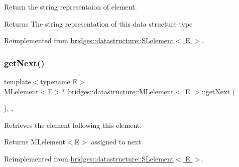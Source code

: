 Return the string representaion of element. 

\begin{DoxyReturn}{Returns}
The string representation of this data structure type 
\end{DoxyReturn}


Reimplemented from \hyperlink{classbridges_1_1datastructure_1_1_s_lelement_a602156aacacd73d1faa365d68d8af31b}{bridges\+::datastructure\+::\+S\+Lelement$<$ E $>$}.

\mbox{\label{classbridges_1_1datastructure_1_1_m_lelement_a47b417db0b948b6899eece572bef9274}} 
\subsubsection{\texorpdfstring{get\+Next()}{getNext()}\hspace{0.1cm}{\footnotesize\ttfamily [1/2]}}
{\footnotesize\ttfamily template$<$typename E$>$ \\
\hyperlink{classbridges_1_1datastructure_1_1_m_lelement}{M\+Lelement}$<$E$>$$\ast$ \hyperlink{classbridges_1_1datastructure_1_1_m_lelement}{bridges\+::datastructure\+::\+M\+Lelement}$<$ E $>$\+::get\+Next (\begin{DoxyParamCaption}{ }\end{DoxyParamCaption})\hspace{0.3cm}{\ttfamily [inline]}, {\ttfamily [override]}, {\ttfamily [virtual]}}



Retrieves the element following this element. 

\begin{DoxyReturn}{Returns}
M\+Lelement$<$\+E$>$ assigned to next 
\end{DoxyReturn}


Reimplemented from \hyperlink{classbridges_1_1datastructure_1_1_s_lelement_ae43dd771d9ced7cb17f1d35f34cd9a42}{bridges\+::datastructure\+::\+S\+Lelement$<$ E $>$}.

\mbox{\label{classbridges_1_1datastructure_1_1_m_lelement_a611b3e7d54fdfbc622004a50ca718e6e}} 

